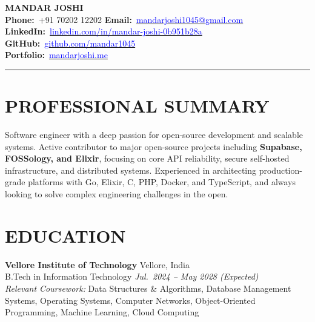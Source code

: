 \documentclass[letterpaper,9.5pt]{article}
\begin{document}
\begin{flushleft}
  {\LARGE \textbf{MANDAR JOSHI}} \\[2pt]
  {\small
  \textbf{Phone:}\ +91 70202 12202 \enspace\textbar{}\enspace
  \textbf{Email:}\ \href{mailto:mandarjoshi1045@gmail.com}{\textcolor{blue}{mandarjoshi1045@gmail.com}} \\[2pt]
  \textbf{LinkedIn:}\ \href{https://linkedin.com/in/mandar-joshi-0b951b28a}{\textcolor{blue}{linkedin.com/in/mandar-joshi-0b951b28a}}
  \enspace\textbar{}\enspace
  \textbf{GitHub:}\ \href{https://github.com/mandar1045}{\textcolor{blue}{github.com/mandar1045}} \\[2pt]
  \textbf{Portfolio:}\ \href{https://mandarjoshi.me}{\textcolor{blue}{mandarjoshi.me}}
  }
\end{flushleft}

\vspace{-4pt}
\noindent\rule{\textwidth}{0.5pt}
\vspace{-6pt}



\section{PROFESSIONAL SUMMARY}

\vspace{2pt}
\noindent
Software engineer with a deep passion for open-source development and scalable systems. Active contributor to major open-source projects including \textbf{Supabase, FOSSology, and Elixir}, focusing on core API reliability, secure self-hosted infrastructure, and distributed systems. Experienced in architecting production-grade platforms with Go, Elixir, C, PHP, Docker, and TypeScript, and always looking to solve complex engineering challenges in the open.

\section{EDUCATION}

\vspace{1pt}
\noindent
\textbf{Vellore Institute of Technology} \hfill Vellore, India \\
B.Tech in Information Technology \hfill \textit{Jul.\ 2024 -- May 2028 (Expected)} \\
\textit{Relevant Coursework:} Data Structures \& Algorithms, Database Management Systems, Operating Systems, Computer Networks, Object-Oriented Programming, Machine Learning, Cloud Computing
\end{document}

